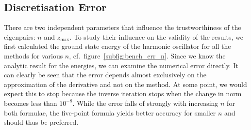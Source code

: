\documentclass[a4paper,DIV=12,english]{scrartcl}
\begin{document}
\subsection{Discretisation Error}
There are two independent parameters that influence the trustworthiness of the eigenpairs: $n$ and $z_\text{max}$. To study their influence on the validity of the results, we first calculated the ground state energy of the harmonic oscillator for all the methods for various $n$, cf.~figure~\ref{subfig:bench_err_n}. Since we know the analytic result for the energies, we can examine the numerical error directly. It can clearly be seen that the error depends almost exclusively on the approximation of the derivative and not on the method. At some point, we would expect this to stop because the inverse iteration stops when the change in norm becomes less than $10^{-8}$. While the error falls of strongly with increasing $n$ for both formulae, the five-point formula yields better accuracy for smaller $n$ and should thus be preferred.
\end{document}
